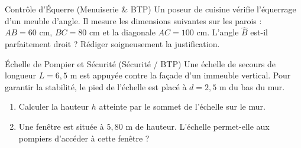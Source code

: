 \begin{exercice}[3 pts]{\capValider}{Contrôle d'Équerre (Menuiserie \& BTP)}
Un poseur de cuisine vérifie l'équerrage d'un meuble d'angle.
Il mesure les dimensions suivantes sur les parois :
$AB = 60\text{ cm}$, $BC = 80\text{ cm}$ et la diagonale $AC = 100\text{ cm}$.
L'angle $\widehat{B}$ est-il parfaitement droit ? Rédiger soigneusement la justification.
\lignesreponse[5]
\end{exercice}

\begin{exercice}[4 pts]{\capAnalyser}{Échelle de Pompier et Sécurité (Sécurité / BTP)}
Une échelle de secours de longueur $L = 6{,}5\text{ m}$ est appuyée contre la façade d'un immeuble vertical.
Pour garantir la stabilité, le pied de l'échelle est placé à $d = 2{,}5\text{ m}$ du bas du mur.

\begin{center}
\end{center}

\begin{enumerate}
    \item Calculer la hauteur $h$ atteinte par le sommet de l'échelle sur le mur.
    \item Une fenêtre est située à $5{,}80\text{ m}$ de hauteur. L'échelle permet-elle aux pompiers d'accéder à cette fenêtre ?
\end{enumerate}
\lignesreponse[5]
\end{exercice}

